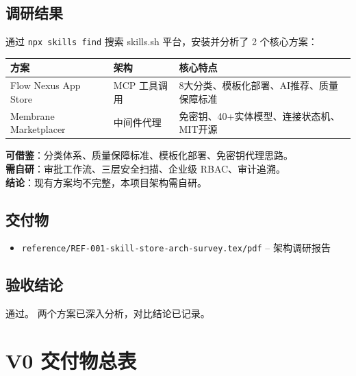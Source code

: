 \documentclass[11pt,a4paper]{article}
\begin{document}
\subsection{调研结果}

通过 \texttt{npx skills find} 搜索 skills.sh 平台，安装并分析了 2 个核心方案：

\begin{table}[h]
\centering
\begin{tabular}{p{3cm}p{4cm}p{4.5cm}}
\toprule
\textbf{方案} & \textbf{架构} & \textbf{核心特点} \\
\midrule
Flow Nexus App Store & MCP 工具调用 & 8大分类、模板化部署、AI推荐、质量保障标准 \\
Membrane Marketplacer & 中间件代理 & 免密钥、40+实体模型、连接状态机、MIT开源 \\
\bottomrule
\end{tabular}
\end{table}

\textbf{可借鉴}：分类体系、质量保障标准、模板化部署、免密钥代理思路。\\
\textbf{需自研}：审批工作流、三层安全扫描、企业级 RBAC、审计追溯。\\
\textbf{结论}：现有方案均不完整，本项目架构需自研。

\subsection{交付物}

\begin{itemize}[nosep]
  \item \texttt{reference/REF-001-skill-store-arch-survey.tex/pdf} -- 架构调研报告
\end{itemize}

\subsection{验收结论}

\textcolor{success}{通过。} 两个方案已深入分析，对比结论已记录。

\section{V0 交付物总表}
\end{document}
